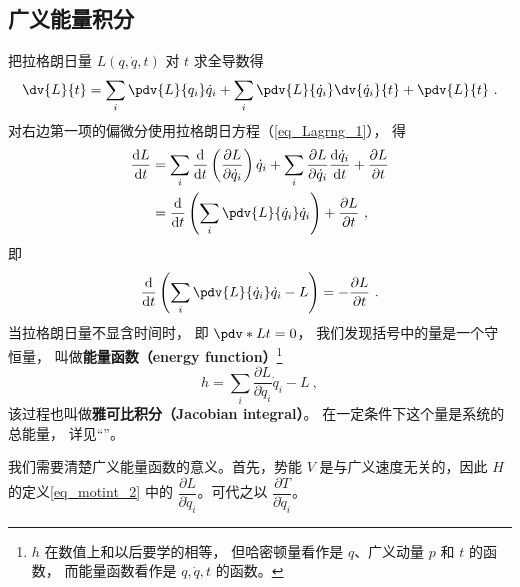 \subsection{广义能量积分}

把拉格朗日量 $L(q, \dot{q}, t)$ 对 $t$ 求全导数得
\begin{equation}
\dv{L}{t} = \sum_{i} \pdv{L}{q_i} \dot{q}_i + \sum_{i} \pdv{L}{\dot{q}_i} \dv{\dot{q}_i}{t} + \pdv{L}{t}~.
\end{equation}
对右边第一项的偏微分使用拉格朗日方程（\autoref{eq_Lagrng_1}）， 得
\begin{equation}
\begin{aligned}
\frac{\mathrm{d} L}{\mathrm{d} t} &=\sum_{i} \frac{\mathrm{d}}{\mathrm{d} t}\left(\frac{\partial L}{\partial \dot{q}_{i}}\right) \dot{q}_{i}+\sum_{i} \frac{\partial L}{\partial \dot{q}_{i}} \frac{\mathrm{d} \dot{q}_{i}}{\mathrm{d} t} + \frac{\partial L}{\partial t} \\
&= \frac{\mathrm{d}}{\mathrm{d} t}\left(\sum_{i} \pdv{L}{\dot q_i} \dot{q}_{i}\right) + \frac{\partial L}{\partial t}~,
\end{aligned}
\end{equation}
即
\begin{equation} \label{eq_motint_1}
\frac{\mathrm{d}}{\mathrm{d} t}\left(\sum_{i} \pdv{L}{\dot q_i} \dot{q}_{i}-L\right) = -\frac{\partial L}{\partial t}~.
\end{equation}
当拉格朗日量不显含时间时， 即 $\pdv*{L}{t} = 0$， 我们发现括号中的量是一个守恒量， 叫做\textbf{能量函数（energy function）}\footnote{$h$ 在数值上和以后要学的相等， 但哈密顿量看作是 $q$、广义动量 $p$ 和 $t$ 的函数， 而能量函数看作是 $q, \dot q, t$ 的函数。}
\begin{equation} \label{eq_motint_2}
h = \sum_{i} \frac{\partial L}{\partial \dot{q}_{i}} \dot{q}_{i}-L~,
\end{equation}
该过程也叫做\textbf{雅可比积分（Jacobian integral）}。 在一定条件下这个量是系统的总能量， 详见“”。


我们需要清楚广义能量函数的意义。首先，势能 $V$ 是与广义速度无关的，因此 $H$ 的定义\autoref{eq_motint_2} 中的 $\dfrac{\partial L}{\partial \dot q_i}$。可代之以 $\dfrac{\partial T}{\partial \dot q_i}$。

